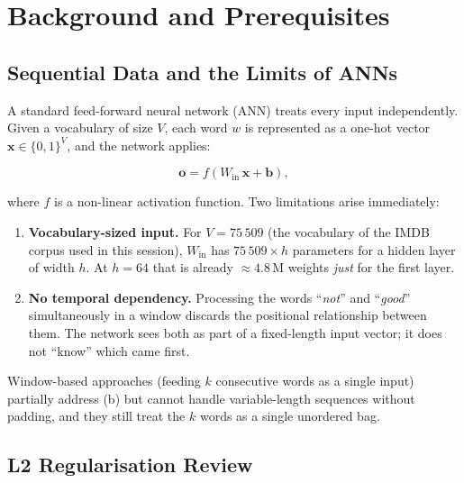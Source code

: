 \documentclass[12pt,a4paper]{article}
\begin{document}
\section{Background and Prerequisites}
\label{sec:background}

\subsection{Sequential Data and the Limits of ANNs}
\label{subsec:ann_limits}

A standard feed-forward neural network (ANN) treats every input
independently.  Given a vocabulary of size $V$, each word $w$ is
represented as a one-hot vector $\mathbf{x} \in \{0,1\}^V$, and the
network applies:

\begin{equation}
  \mathbf{o} = f\!\left(W_{\text{in}}\,\mathbf{x} + \mathbf{b}\right),
  \label{eq:ann_forward}
\end{equation}

where $f$ is a non-linear activation function.  Two limitations arise
immediately:

\begin{enumerate}[label=(\alph*)]
  \item \textbf{Vocabulary-sized input.}  For $V = 75\,509$ (the vocabulary
        of the IMDB corpus used in this session), $W_{\text{in}}$ has
        $75\,509 \times h$ parameters for a hidden layer of width $h$.
        At $h=64$ that is already $\approx 4.8$\,M weights \emph{just}
        for the first layer.
  \item \textbf{No temporal dependency.}  Processing the words
        ``\emph{not}'' and ``\emph{good}'' simultaneously in a window
        discards the positional relationship between them.  The network
        sees both as part of a fixed-length input vector; it does not
        ``know'' which came first.
\end{enumerate}

Window-based approaches (feeding $k$ consecutive words as a single
input) partially address (b) but cannot handle variable-length
sequences without padding, and they still treat the $k$ words as a
single unordered bag.

\subsection{L2 Regularisation Review}
\label{subsec:l2_review}
\end{document}
